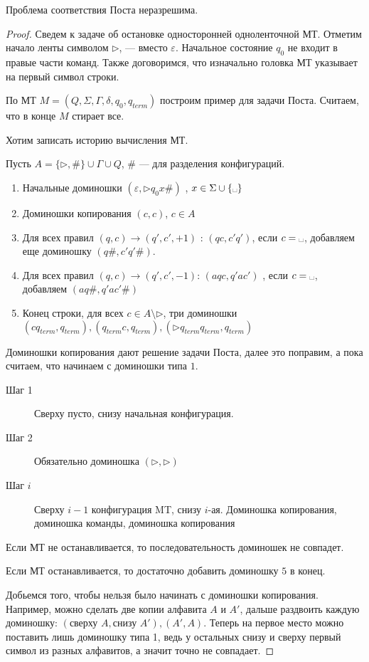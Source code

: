 \begin{thm}[Пост, 1946]
    Проблема соответствия Поста неразрешима.
\end{thm}
\begin{proof}
    Сведем к задаче об остановке односторонней одноленточной МТ. Отметим начало ленты символом $ \triangleright$, \textvisiblespace --- вместо  $ \varepsilon $. Начальное состояние $  q_0$ не входит в правые части команд. Также договоримся, что изначально головка МТ указывает на первый символ строки.

	По МТ $ M = (Q, \Sigma, \Gamma, \delta , q_0, q_{term})$ построим пример для задачи Поста.
	Считаем, что в конце $ M$ стирает все.

	Хотим записать историю вычисления МТ.

	Пусть $ A = \{\triangleright, \#\} \cup \Gamma \cup  Q$, $ \#$ --- для разделения конфигураций.

	\begin{enumerate}
		\item Начальные доминошки $ ( \varepsilon , \triangleright q_0 x \#)$ , $ x \in \Sigma \cup \{\text{\textvisiblespace}\}$
		\item Доминошки копирования $ (c, c)$, $ c \in A $ 
		\item  Для всех правил $ (q, c) \to  (q', c', +1)$ : $(qc, c'q')$, если $ c = \text{\textvisiblespace}$, добавляем еще доминошку $ (q\# , c'q'\#)$.
		\item Для всех правил $ (q, c) \to  (q', c', -1)$: $ (aqc, q'ac')$ , если $ c = \text{\textvisiblespace}$, добавляем $ (aq\#, q'ac'\#)$ 
		\item Конец строки, для всех $ c \in A \setminus \triangleright$, три доминошки
			$ (cq_{term}, q_{term}), (q_{term}c, q_{term}), (\triangleright q_{term}q_{term}, q_{term})$
	\end{enumerate} 
	\begin{note}
	    Доминошки копирования дают решение задачи Поста, далее это поправим, а пока считаем, что начинаем с доминошки типа $ 1$.
	\end{note}
	\begin{description}
		\item[Шаг 1] Сверху пусто, снизу начальная конфигурация.
		\item[Шаг 2] Обязательно доминошка $ (\triangleright, \triangleright)$ 
		\item[Шаг $ i$] Сверху $ i-1$ конфигурация MT, снизу  $ i$-ая.
			Доминошка копирования, доминошка команды, доминошка копирования
	\end{description}
	Если МТ не останавливается, то последовательность доминошек не совпадет.

	Если МТ останавливается, то достаточно добавить доминошку  $ 5$ в конец.

	Добьемся того, чтобы нельзя было начинать с доминошки копирования. 
	Например, можно сделать две копии алфавита $ A$ и $ A'$,
	дальше раздвоить каждую доминошку: $ (\text{сверху }A, \text{снизу }A'), (A', A)$.
	Теперь на первое место можно поставить лишь доминошку типа 1, 
	ведь у остальных снизу и сверху первый символ из разных алфавитов, а значит точно не совпадает.
\end{proof}



